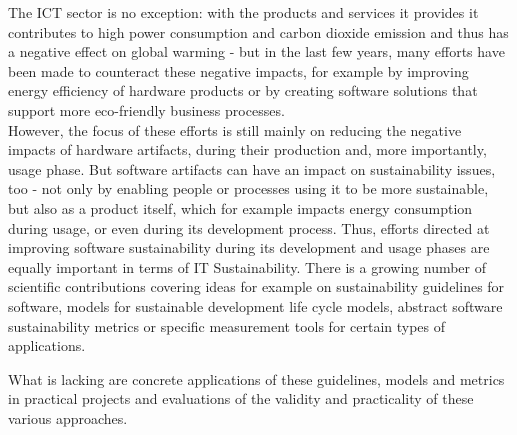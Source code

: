 The ICT sector is no exception: with the products and services it provides it contributes to high power consumption and carbon dioxide emission %
 and thus has a negative effect on global warming \cite{smart2020} %
- but in the last few years, many efforts have been made to counteract these negative impacts, for example by improving energy efficiency of hardware products or by creating software solutions that support more eco-friendly business processes.\\
However, the focus of these efforts is still mainly on reducing the negative impacts of hardware artifacts, %
 during their production and, more importantly, usage phase. But software artifacts can have an impact on sustainability issues, too - not only by enabling people or processes using it to be more sustainable, but also as a product itself, which for example impacts energy consumption during usage, or even during its development process. %
Thus, efforts directed at improving software sustainability during its development and usage phases are equally important in terms of IT Sustainability. 
There is a growing number of scientific contributions covering ideas for example on sustainability guidelines for software, models for sustainable development life cycle models, abstract software sustainability metrics or specific measurement tools for certain types of applications. %

What is lacking %
are %
concrete applications of these guidelines, models and metrics in practical projects %
and evaluations of the validity and practicality of these various approaches.


